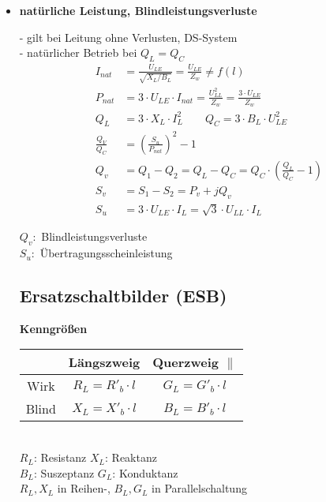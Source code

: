 \begin{itemize}
    \item[] \textbf{natürliche Leistung, Blindleistungsverluste}

        - gilt bei Leitung ohne Verlusten, DS-System\\
        - natürlicher Betrieb bei $Q_L = Q_C$
        \begin{align*}
            I_{nat} &= \frac{U_{LE}}{\sqrt{X_L/B_L}} =  \frac{U_{LE}}{Z_w} \neq f(l)\\
            P_{nat} &= 3 \cdot U_{LE} \cdot I_{nat} = \frac{U^2_{LL}}{Z_w} = \frac{3 \cdot U_{LE}}{Z_w}\\
            Q_L &= 3 \cdot X_L \cdot I_L^2 \qquad Q_C = 3 \cdot B_L \cdot U^2_{LE}\\
            \frac{Q_V}{Q_C} &= \left(\frac{S_u}{P_{nat}} \right)^2-1\\
            Q_v &= Q_1 - Q_2 = Q_L - Q_C = Q_C \cdot (\frac{Q_L}{Q_C}-1)\\
            S_v &= S_1 - S_2 = P_v + j Q_v\\
            S_u &= 3 \cdot U_{LE} \cdot I_L = \sqrt{3} \cdot U_{LL} \cdot I_L
        \end{align*}

        \indent $Q_v:$ Blindleistungsverluste\\
        \indent $S_u:$ Übertragungsscheinleistung

\subsection{Ersatzschaltbilder (ESB)}

\textbf{Kenngrößen}\\

\begin{tabular}[h]{c|c|c}
    & Längszweig & Querzweig $\parallel$ \\
    \hline
    Wirk & $R_L = R'_b \cdot l$ & $G_L= G'_b \cdot l$\\
    Blind & $X_L = X'_b \cdot l$ & $B_L = B'_b \cdot l$\\
\end{tabular}\\

$R_L$: Resistanz \qquad $X_L$: Reaktanz\\
$B_L$: Suszeptanz \qquad $G_L$: Konduktanz\\

$R_L, X_L$ in Reihen-, $B_L, G_L$ in Parallelschaltung\\


\end{itemize}
